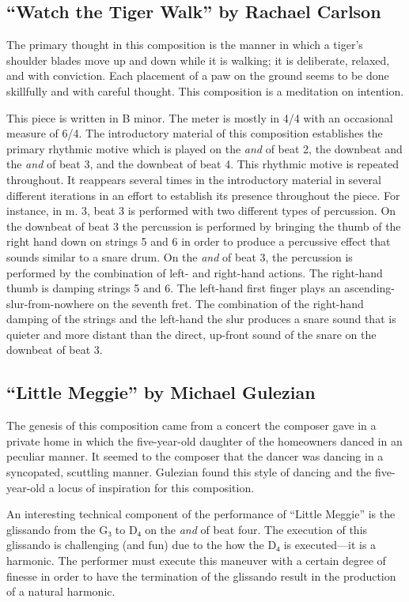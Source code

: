\documentclass{tufte-handout}
\begin{document}
\subsection*{``Watch the Tiger Walk'' by Rachael Carlson}
\label{sec:watch-tiger-walk}
The primary thought in this composition is the manner in which a tiger's shoulder blades move up and down while it is walking; it is deliberate, relaxed, and with conviction. Each placement of a paw on the ground seems to be done skillfully and with careful thought. This composition is a meditation on intention.

This piece is written in B minor. The meter is mostly in 4/4 with an
occasional measure of 6/4. The introductory material of this composition
establishes the primary rhythmic motive which is played on the \emph{and} of
beat 2, the downbeat and the \emph{and} of beat 3, and the downbeat of beat
4. This rhythmic motive is repeated throughout. It reappears
several times in the introductory material in several different iterations in an
effort to establish its presence throughout the piece. For instance, in m. 3,
beat 3 is performed with two different types of percussion. On the downbeat of
beat 3 the percussion is performed by bringing the thumb of the right hand
down on strings 5 and 6 in order to produce a percussive effect that sounds
similar to a snare drum. On the \emph{and} of beat 3, the percussion is
performed by the combination of left- and right-hand actions. The right-hand
thumb is damping strings 5 and 6. The left-hand first finger plays an
ascending-slur-from-nowhere on the seventh fret. The combination of the
right-hand damping of the strings and the left-hand the slur produces a snare sound that is quieter and more distant than the direct, up-front sound of the snare on the downbeat of beat 3.

\subsection*{``Little Meggie'' by Michael Gulezian}
\label{sec:little-megg-rach}
The genesis of this composition came from a concert the composer gave in a private home in which the five-year-old daughter of the homeowners danced in an peculiar manner. It seemed to the composer that the dancer was dancing in a syncopated, scuttling manner. Gulezian found this style of dancing and the five-year-old a locus of inspiration for this composition. 

An interesting technical component of the performance of ``Little Meggie'' is the glissando from the G₃ to D₄ on the \emph{and} of beat four. The execution of this glissando is challenging (and fun) due to the how the D₄ is executed—it is a harmonic. The performer must execute this maneuver with a certain degree of finesse in order to have the termination of the glissando result in the production of a natural harmonic.
\end{document}
